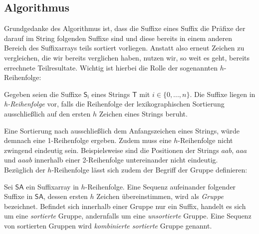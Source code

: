 \subsection{Algorithmus}
Grundgedanke des Algorithmus ist, dass die Suffixe eines Suffix die Präfixe der darauf im String folgenden Suffixe sind und diese bereits in einem anderen Bereich des Suffixarrays teils sortiert vorliegen. Anstatt also erneut Zeichen zu vergleichen, die wir bereits verglichen haben, nutzen wir, so weit es geht, bereits errechnete Teilresultate.
Wichtig ist hierbei die Rolle der sogenannten $h$-Reihenfolge:
\begin{definition}[$h$-Reihenfolge]
Gegeben seien die Suffixe $\mathsf{S_i}$ eines Strings $\mathsf{T}$ mit $i \in \{0,...,n\}$. Die Suffixe liegen in \textit{h-Reihenfolge} vor, falls die Reihenfolge der lexikographischen Sortierung ausschließlich auf den ersten $h$ Zeichen eines Strings beruht. 
\end{definition}
Eine Sortierung nach ausschließlich dem Anfangszeichen eines Strings, würde demnach eine 1-Reihenfolge ergeben. Zudem muss eine $h$-Reihenfolge nicht zwingend eindeutig sein. Beispielsweise sind die Positionen der Strings $aab$, $aaa$ und $aaab$ innerhalb einer 2-Reihenfolge untereinander nicht eindeutig. \\
Bezüglich der $h$-Reihenfolge lässt sich zudem der Begriff der Gruppe definieren:
\begin{definition}[Gruppe]
Sei $\mathsf{SA}$ ein Suffixarray in $h$-Reihenfolge. Eine Sequenz aufeinander folgender Suffixe in $\mathsf{SA}$, dessen ersten $h$ Zeichen übereinstimmen, wird als \textit{Gruppe} bezeichnet. Befindet sich innerhalb einer Gruppe nur ein Suffix, handelt es sich um eine \textit{sortierte} Gruppe, andernfalls um eine \textit{unsortierte} Gruppe. 
Eine Sequenz von sortierten Gruppen wird \textit{kombinierte sortierte} Gruppe genannt.
\end{definition}

